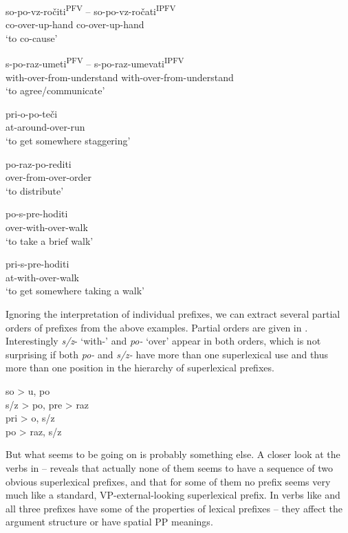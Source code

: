 \documentclass[output=paper,colorlinks,citecolor=brown]{langscibook}
\begin{document}
\ea \label{ex:sopovzrociti}
 \gll so-po-vz-ročiti\textsuperscript{PFV}  -- so-po-vz-ročati\textsuperscript{IPFV}  \\ 
co-over-up-hand {} co-over-up-hand\\ 
\glt `to co-cause’\\
\z

\ea \label{ex:pppumeti}
 \gll s-po-raz-umeti\textsuperscript{PFV}   -- s-po-raz-umevati\textsuperscript{IPFV} \\ 
with-over-from-understand {} with-over-from-understand\\ 
\glt `to agree/communicate’\\
\z

\ea \label{ex:pppteči}
\gll pri-o-po-teči \\
at-around-over-run \\
\glt `to get somewhere staggering'
\z

\ea\label{ex:porazporediti} 
\gll po-raz-po-rediti\\
over-from-over-order \\
\glt `to distribute' 
\z

\ea\label{ex:posprehoditi}
\gll po-s-pre-hoditi\\
 over-with-over-walk\\
\glt `to take a brief walk'
\z 

\ea \label{ex:pppmeriti}
\gll pri-s-pre-hoditi\\
 at-with-over-walk\\
\glt `to get somewhere taking a walk'
\z


\noindent Ignoring the interpretation of individual prefixes, we can extract several partial orders of prefixes from the above examples. Partial orders are given in . Interestingly \textit{s/z}- `with-' and \textit{po-} `over' appear in both orders, which is not surprising if both \textit{po-} and \textit{s/z-} have more than one superlexical use and thus more than one position in the hierarchy of superlexical prefixes.

\ea \label{ex:prefixiVTriprefigiranihGlagolih}
so > u, po \\
s/z > po, pre > raz\\
pri > o, s/z \\
po > raz, s/z 
\z

\noindent But what seems to be going on is probably something else. A closer look at the verbs in -- reveals that actually none of them seems to have a sequence of two obvious superlexical prefixes, and that for some of them no prefix seems very much like a standard, VP-external-looking superlexical prefix. In verbs like  and  all three prefixes have some of the properties of lexical prefixes -- they affect the argument structure or have spatial PP meanings.
\end{document}
